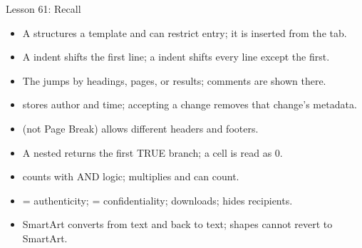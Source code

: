 \documentclass[aspectratio=169]{beamer}
\begin{document}
\begin{frame}{Lesson 61: Recall}
  \begin{itemize}
    \item A  structures a template and can restrict
      entry; it is inserted from the  tab.
    \item A  indent shifts the first line; a 
      indent shifts every line except the first.
    \item The  jumps by headings, pages, or results;
      comments are  shown there.
    \item {} stores author and time; accepting a change
      removes that change's metadata.
    \item {} (not Page Break) allows different headers and
      footers.
    \item A nested  returns the first TRUE branch; a  cell
      is read as 0.
    \item {} counts with AND logic;  multiplies
      and can count.
    \item {} = authenticity;  =
      confidentiality;  downloads;  hides recipients.
    \item SmartArt converts from text and back to text; shapes cannot revert
      to SmartArt.
  \end{itemize}
\end{frame}
\end{document}
